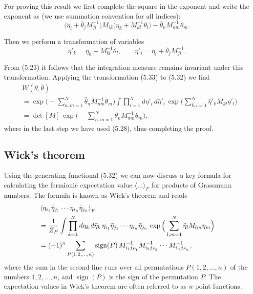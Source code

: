For proving this result we first complete the square in the exponent and write
the exponent as (we use summation convention for all indices):
\begin{equation}
  \big(\bar{\eta}_i + \bar{\theta}_j M^{-1}_{ji}\big) M_{ik}
  \big(\eta_k + M^{-1}_{kl}\theta_l\big)
  - \bar{\theta}_n M^{-1}_{nm}\theta_m .
\end{equation}

Then we perform a transformation of variables
\begin{equation}
  \eta'_k = \eta_k + M^{-1}_{kl}\theta_l, \qquad
  \bar{\eta}'_i = \bar{\eta}_i + \bar{\theta}_j M^{-1}_{ji} .
\end{equation}

From (5.23) it follows that the integration measure remains invariant under
this transformation. Applying the transformation (5.33) to (5.32) we find
\begin{equation}
  \begin{aligned}
    &W(\theta,\bar{\theta})\\
    &= \exp\Big(-\sum_{n,m=1}^{N}\bar{\theta}_n M^{-1}_{nm}\theta_m\Big)
      \int\prod_{i=1}^{N}d\eta'_i\,d\bar{\eta}'_i\,
      \exp\Big(\sum_{k,l=1}^{N}\bar{\eta}'_k M_{kl}\eta'_l\Big)\\
    &= \det[M]\,\exp\Big(-\sum_{n,m=1}^{N}\bar{\theta}_n M^{-1}_{nm}\theta_m\Big) ,
  \end{aligned}
\end{equation}
where in the last step we have used (5.28), thus completing the proof.

\subsection{Wick's theorem}

Using the generating functional (5.32) we can now discuss a key formula for
calculating the fermionic expectation value $\langle\ldots\rangle_F$ for products of Grassmann
numbers. The formula is known as Wick's theorem and reads
\begin{equation}
  \begin{aligned}
    &\left\langle \eta_{i_1}\bar{\eta}_{j_1}\cdots\eta_{i_n}\bar{\eta}_{j_n} \right\rangle_F\\
    &= \frac{1}{Z_F}\int\prod_{k=1}^{N}d\eta_k\,d\bar{\eta}_k\,
      \eta_{i_1}\bar{\eta}_{j_1}\cdots\eta_{i_n}\bar{\eta}_{j_n}\,
      \exp\Big(\sum_{l,m=1}^{N}\bar{\eta}_l M_{lm}\eta_m\Big)\\
    &= (-1)^n\sum_{P(1,2,\ldots,n)}\operatorname{sign}(P)\,
      M^{-1}_{i_1 j_{P_1}}M^{-1}_{i_2 j_{P_2}}\cdots M^{-1}_{i_n j_{P_n}} ,
  \end{aligned}
\end{equation}
where the sum in the second line runs over all permutations $P(1, 2, \ldots, n)$ of
the numbers $1, 2, \ldots, n$, and $\operatorname{sign}(P)$ is the sign of the permutation $P$. The
expectation values in Wick's theorem are often referred to as $n$-point functions.

